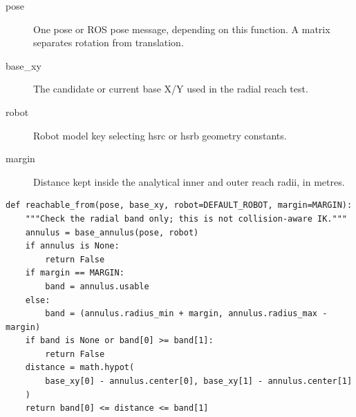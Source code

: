 \documentclass[11pt,a4paper]{book}
\begin{document}
\begin{description}
\item[pose] One pose or ROS pose message, depending on this function. A matrix separates rotation from translation.
\item[base\_xy] The candidate or current base X/Y used in the radial reach test.
\item[robot] Robot model key selecting hsrc or hsrb geometry constants.
\item[margin] Distance kept inside the analytical inner and outer reach radii, in metres.
\end{description}

\begin{lstlisting}[firstnumber=169]
def reachable_from(pose, base_xy, robot=DEFAULT_ROBOT, margin=MARGIN):
    """Check the radial band only; this is not collision-aware IK."""
    annulus = base_annulus(pose, robot)
    if annulus is None:
        return False
    if margin == MARGIN:
        band = annulus.usable
    else:
        band = (annulus.radius_min + margin, annulus.radius_max - margin)
    if band is None or band[0] >= band[1]:
        return False
    distance = math.hypot(
        base_xy[0] - annulus.center[0], base_xy[1] - annulus.center[1]
    )
    return band[0] <= distance <= band[1]


\end{lstlisting}
\end{document}
